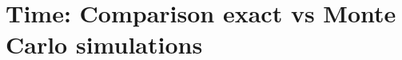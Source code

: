 % 
% 
% 
% 
% 
% 
% 
% 
% 
% 

% 

\section{Time: Comparison exact vs Monte Carlo simulations}

% 
% 
% 

